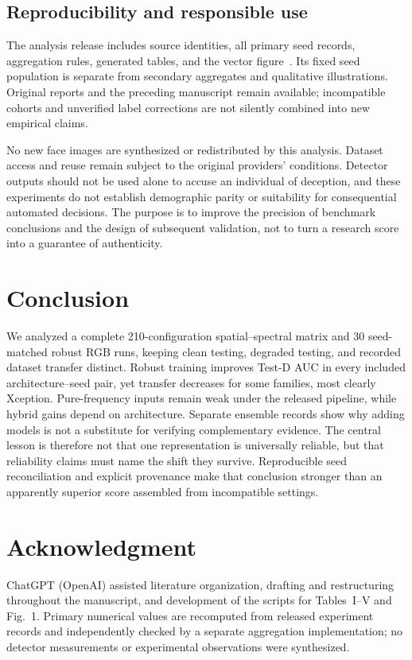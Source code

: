 \documentclass[conference,10pt,letterpaper]{IEEEtran}
\begin{document}
\subsection{Reproducibility and responsible use}
The analysis release includes source identities, all primary seed records, aggregation rules, generated tables, and the vector figure~\cite{release2026}. Its fixed seed population is separate from secondary aggregates and qualitative illustrations. Original reports and the preceding manuscript remain available; incompatible cohorts and unverified label corrections are not silently combined into new empirical claims.

No new face images are synthesized or redistributed by this analysis. Dataset access and reuse remain subject to the original providers' conditions. Detector outputs should not be used alone to accuse an individual of deception, and these experiments do not establish demographic parity or suitability for consequential automated decisions. The purpose is to improve the precision of benchmark conclusions and the design of subsequent validation, not to turn a research score into a guarantee of authenticity.

\section{Conclusion}
We analyzed a complete 210-configuration spatial--spectral matrix and 30 seed-matched robust RGB runs, keeping clean testing, degraded testing, and recorded dataset transfer distinct. Robust training improves Test-D AUC in every included architecture--seed pair, yet transfer decreases for some families, most clearly Xception. Pure-frequency inputs remain weak under the released pipeline, while hybrid gains depend on architecture. Separate ensemble records show why adding models is not a substitute for verifying complementary evidence. The central lesson is therefore not that one representation is universally reliable, but that reliability claims must name the shift they survive. Reproducible seed reconciliation and explicit provenance make that conclusion stronger than an apparently superior score assembled from incompatible settings.

\section*{Acknowledgment}
ChatGPT (OpenAI) assisted literature organization, drafting and restructuring throughout the manuscript, and development of the scripts for Tables~I--V and Fig.~1. Primary numerical values are recomputed from released experiment records and independently checked by a separate aggregation implementation; no detector measurements or experimental observations were synthesized.

\balance


\end{document}
